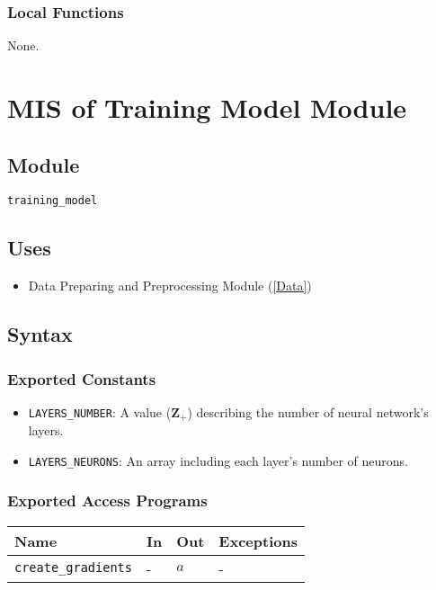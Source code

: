 \documentclass[12pt, titlepage]{article}
\def\code#1{\texttt{#1}}
\begin{document}
\subsubsection{Local Functions}
None.

\newpage

\section{MIS of Training Model Module} \label{Train-Model} 

\subsection{Module}
\code{training\_model} 

\subsection{Uses}
\begin{itemize}
  \item Data Preparing and Preprocessing Module (\ref{Data})
\end{itemize}


\subsection{Syntax}
\subsubsection{Exported Constants}
\begin{itemize}
  \item \code{LAYERS\_NUMBER}: A value ($\mathbf{Z}_{+}$) describing the number of 
  neural network's layers.
  \item \code{LAYERS\_NEURONS}: An array including each layer's number of neurons.
\end{itemize}

\subsubsection{Exported Access Programs}

\begin{center}
\begin{tabular}{p{3.5cm} p{4cm} p{4cm} p{3.5cm}}
\hline
\textbf{Name} & \textbf{In} & \textbf{Out} & \textbf{Exceptions} \\
\hline
\code{create\_gradients} & - & $a$ & - \\
\hline
\end{tabular}
\end{center}
\end{document}

